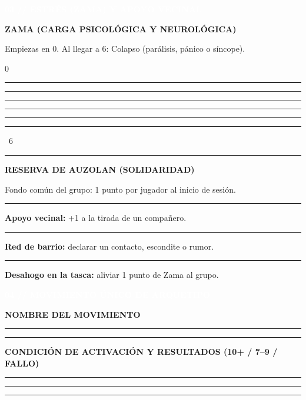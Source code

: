 \documentclass[10pt,a4paper,oneside]{book}
\newcommand{\rulefield}[2][\linewidth]{%
  \begin{minipage}[t]{#1}
  \textcolor{InkSoft}{\industrialfont\scriptsize\bfseries\MakeUppercase{#2}}\par
  \vspace{0.8mm}\textcolor{Line}{\rule{\linewidth}{0.45pt}}
  \end{minipage}}
\newcommand{\strip}[1]{%
  \vspace{0.8mm}\noindent
  \colorbox{CarbonDark}{\parbox{\dimexpr\linewidth-2\fboxsep\relax}{%
    \textcolor{white}{\industrialfont\bfseries\small\MakeUppercase{#1}}}}\par
  \vspace{0.8mm}}
\newcommand{\checkline}[2]{%
  \textcolor{#1}{\rule{2.4mm}{2.4mm}}\hspace{1mm}\textcolor{InkSoft}{\scriptsize #2}}
\begin{document}
\begin{minipage}[t]{0.48\linewidth}
  \strip{03 // Estrés (Zama) y apoyo vecinal}
  \begin{tcolorbox}[enhanced,colback=GoldPale,colframe=GoldDark,boxrule=.6pt,
    arc=0.8mm,left=4pt,right=4pt,top=2.5pt,bottom=2.5pt,height=44mm]
    {\industrialfont\bfseries\color{GoldDark}ZAMA (CARGA PSICOLÓGICA Y NEUROLÓGICA)}\par
    \textcolor{InkSoft}{\scriptsize Empiezas en 0. Al llegar a 6: Colapso (parálisis, pánico o síncope).}\par
    \vspace{2mm}
    \begin{center}
      \textcolor{InkSoft}{\scriptsize 0}\quad
      \checkline{AcidSirimiri}{}\quad
      \checkline{AcidSirimiri}{}\quad
      \checkline{AcidSirimiri}{}\quad
      \checkline{AcidSirimiri}{}\quad
      \checkline{AcidSirimiri}{}\quad
      \textcolor{OrekakRust}{\rule{2.8mm}{2.8mm}}\ \textcolor{OrekakRust}{\scriptsize 6}
    \end{center}
    \vspace{0.5mm}\textcolor{Line}{\rule{\linewidth}{.4pt}}\vspace{1mm}
    {\industrialfont\bfseries\color{GoldDark}RESERVA DE AUZOLAN (SOLIDARIDAD)}\par
    \textcolor{InkSoft}{\scriptsize Fondo común del grupo: 1 punto por jugador al inicio de sesión.}\par
    \vspace{0.5mm}
    {\color{InkSoft}\scriptsize
      \checkline{GoldDark}{} \textbf{Apoyo vecinal:} +1 a la tirada de un compañero.\par\vspace{0.8mm}
      \checkline{GoldDark}{} \textbf{Red de barrio:} declarar un contacto, escondite o rumor.\par\vspace{0.8mm}
      \checkline{GoldDark}{} \textbf{Desahogo en la tasca:} aliviar 1 punto de Zama al grupo.}
  \end{tcolorbox}
\end{minipage}

\strip{04 // Movimiento único de arquetipo}

\begin{tcolorbox}[enhanced,colback=RustPale,colframe=OrekakRust,boxrule=.6pt,
  arc=0.8mm,left=5pt,right=5pt,top=2.5pt,bottom=2.5pt]
  \begin{minipage}[t]{0.32\linewidth}
    \rulefield{Nombre del movimiento}\par\vspace{2mm}
    \textcolor{Line}{\rule{\linewidth}{.4pt}}
  \end{minipage}\hfill
  \begin{minipage}[t]{0.62\linewidth}
    \rulefield{Condición de activación y resultados (10+ / 7--9 / Fallo)}\par\vspace{2mm}
    \textcolor{Line}{\rule{\linewidth}{.4pt}}\par\vspace{2mm}
    \textcolor{Line}{\rule{\linewidth}{.4pt}}
  \end{minipage}
\end{tcolorbox}
\end{document}
